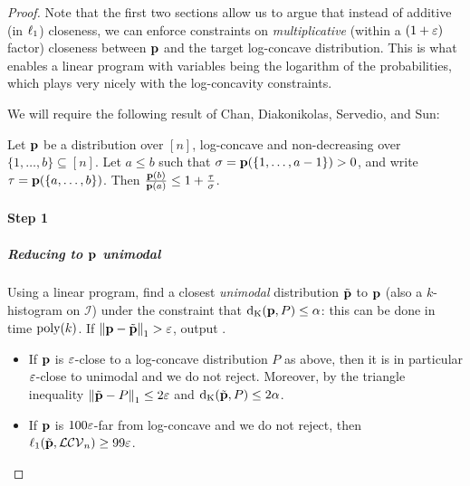 \begin{proof}
Note that the first two sections allow us to argue that instead of additive (in $\lp[1]$) closeness, we can enforce constraints on \emph{multiplicative} (within a $(1+\eps)$ factor) closeness between $\D$ and the target log-concave distribution. This is what enables a linear program with variables being the logarithm of the probabilities, which plays very nicely with the log-concavity constraints. \medskip

\noindent We will require the following result of Chan, Diakonikolas, Servedio, and Sun:
\begin{theorem}\label{lemma:cdss13:41}
Let $\D$ be a distribution over $[n]$, log-concave and non-decreasing over $\{1,\dots,b\} \subseteq [n]$. Let $a\leq b$ such that
 $\sigma = \D(\{1,\dots,a-1\}) > 0$, and write $\tau=\D(\{a,\dots,b\})$. Then 
 		$\frac{\D(b)}{\D(a)} \leq 1+\frac{\tau}{\sigma}$.
\end{theorem}

\paragraph{Step 1}\label{stage:1}

\subparagraph{Reducing to $\D$ unimodal}
Using a linear program, find a closest \emph{unimodal} distribution $\tilde{\D}$ to $\D$ (also a $k$-histogram on $\mathcal{I}$) under the constraint that $\kolmogorov{\D}{P} \leq \alpha$: this can be done in time $\poly(k)$. If $\normone{\D-\tilde{\D}} > \eps$, output \reject.

\begin{itemize}
  \item If $\D$ is $\eps$-close to a log-concave distribution $P$ as above, then it is in particular $\eps$-close to unimodal and we do not reject. Moreover, by the triangle inequality $\normone{\tilde{\D} - P} \leq 2\eps$ and $\kolmogorov{\tilde{\D}}{P} \leq 2\alpha$.
  \item If $\D$ is $100\eps$-far from log-concave and we do not reject, then $\lp[1](\tilde{\D},\classlogconcave) \geq 99\eps$.
\end{itemize}


\end{proof}
